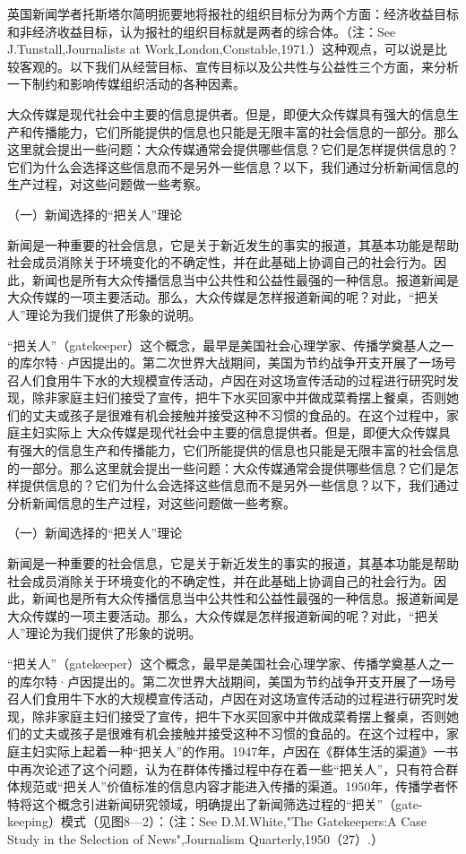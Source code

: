 \documentclass[UTF8,12pt]{ctexart}
\numberwithin{equation}{section} %
\numberwithin{figure}{section}
\numberwithin{table}{section}
\begin{document}
	英国新闻学者托斯塔尔简明扼要地将报社的组织目标分为两个方面：经济收益目标和非经济收益目标，认为报社的组织目标就是两者的综合体。（注：See J.Tunstall,Journalists at Work,London,Constable,1971.）这种观点，可以说是比较客观的。以下我们从经营目标、宣传目标以及公共性与公益性三个方面，来分析一下制约和影响传媒组织活动的各种因素。
	
	大众传媒是现代社会中主要的信息提供者。但是，即便大众传媒具有强大的信息生产和传播能力，它们所能提供的信息也只能是无限丰富的社会信息的一部分。那么这里就会提出一些问题：大众传媒通常会提供哪些信息？它们是怎样提供信息的？它们为什么会选择这些信息而不是另外一些信息？以下，我们通过分析新闻信息的生产过程，对这些问题做一些考察。
	
	（一）新闻选择的“把关人”理论
	
	新闻是一种重要的社会信息，它是关于新近发生的事实的报道，其基本功能是帮助社会成员消除关于环境变化的不确定性，并在此基础上协调自己的社会行为。因此，新闻也是所有大众传播信息当中公共性和公益性最强的一种信息。报道新闻是大众传媒的一项主要活动。那么，大众传媒是怎样报道新闻的呢？对此，“把关人”理论为我们提供了形象的说明。
	
	“把关人”（gatekeeper）这个概念，最早是美国社会心理学家、传播学奠基人之一的库尔特·卢因提出的。第二次世界大战期间，美国为节约战争开支开展了一场号召人们食用牛下水的大规模宣传活动，卢因在对这场宣传活动的过程进行研究时发现，除非家庭主妇们接受了宣传，把牛下水买回家中并做成菜肴摆上餐桌，否则她们的丈夫或孩子是很难有机会接触并接受这种不习惯的食品的。在这个过程中，家庭主妇实际上
	大众传媒是现代社会中主要的信息提供者。但是，即便大众传媒具有强大的信息生产和传播能力，它们所能提供的信息也只能是无限丰富的社会信息的一部分。那么这里就会提出一些问题：大众传媒通常会提供哪些信息？它们是怎样提供信息的？它们为什么会选择这些信息而不是另外一些信息？以下，我们通过分析新闻信息的生产过程，对这些问题做一些考察。
	
	（一）新闻选择的“把关人”理论
	
	新闻是一种重要的社会信息，它是关于新近发生的事实的报道，其基本功能是帮助社会成员消除关于环境变化的不确定性，并在此基础上协调自己的社会行为。因此，新闻也是所有大众传播信息当中公共性和公益性最强的一种信息。报道新闻是大众传媒的一项主要活动。那么，大众传媒是怎样报道新闻的呢？对此，“把关人”理论为我们提供了形象的说明。
	
	“把关人”（gatekeeper）这个概念，最早是美国社会心理学家、传播学奠基人之一的库尔特·卢因提出的。第二次世界大战期间，美国为节约战争开支开展了一场号召人们食用牛下水的大规模宣传活动，卢因在对这场宣传活动的过程进行研究时发现，除非家庭主妇们接受了宣传，把牛下水买回家中并做成菜肴摆上餐桌，否则她们的丈夫或孩子是很难有机会接触并接受这种不习惯的食品的。在这个过程中，家庭主妇实际上起着一种“把关人”的作用。1947年，卢因在《群体生活的渠道》一书中再次论述了这个问题，认为在群体传播过程中存在着一些“把关人”，只有符合群体规范或“把关人”价值标准的信息内容才能进入传播的渠道。1950年，传播学者怀特将这个概念引进新闻研究领域，明确提出了新闻筛选过程的“把关”（gate-keeping）模式（见图8—2）：（注：See D.M.White,"The Gatekeepers:A Case Study in the Selection of News",Journalism Quarterly,1950（27）.）
	
\end{document}
